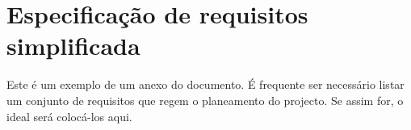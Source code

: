 \chapter{Especificação de requisitos simplificada}
\label{chap:za}

Este é um exemplo de um anexo do documento. É frequente ser necessário listar um conjunto de requisitos que regem o planeamento do projecto. Se assim for, o ideal será colocá-los aqui.